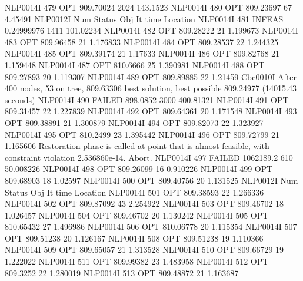 NLP0014I           479         OPT 909.70024     2024 143.1523
NLP0014I           480         OPT 809.23697       67 4.45491
NLP0012I 
              Num      Status      Obj             It       time                 Location
NLP0014I           481      INFEAS 0.24999976     1411 101.02234
NLP0014I           482         OPT 809.28222       21 1.199673
NLP0014I           483         OPT 809.96458       21 1.176833
NLP0014I           484         OPT 809.28537       22 1.244325
NLP0014I           485         OPT 809.39174       21 1.17633
NLP0014I           486         OPT 809.82768       21 1.159448
NLP0014I           487         OPT 810.6666       25 1.390981
NLP0014I           488         OPT 809.27893       20 1.119307
NLP0014I           489         OPT 809.89885       22 1.21459
Cbc0010I After 400 nodes, 53 on tree, 809.63306 best solution, best possible 809.24977 (14015.43 seconds)
NLP0014I           490      FAILED 898.0852     3000 400.81321
NLP0014I           491         OPT 809.31457       22 1.227839
NLP0014I           492         OPT 809.64361       20 1.171548
NLP0014I           493         OPT 809.38891       21 1.300879
NLP0014I           494         OPT 809.82073       22 1.323927
NLP0014I           495         OPT 810.2499       23 1.395442
NLP0014I           496         OPT 809.72799       21 1.165606
Restoration phase is called at point that is almost feasible,
  with constraint violation 2.536860e-14. Abort.
NLP0014I           497      FAILED 1062189.2      610 50.008226
NLP0014I           498         OPT 809.26099       16 0.910226
NLP0014I           499         OPT 809.68903       18 1.02597
NLP0014I           500         OPT 809.40756       20 1.131525
NLP0012I 
              Num      Status      Obj             It       time                 Location
NLP0014I           501         OPT 809.38593       22 1.266336
NLP0014I           502         OPT 809.87092       43 2.254922
NLP0014I           503         OPT 809.46702       18 1.026457
NLP0014I           504         OPT 809.46702       20 1.130242
NLP0014I           505         OPT 810.65432       27 1.496986
NLP0014I           506         OPT 810.06778       20 1.115354
NLP0014I           507         OPT 809.51238       20 1.126167
NLP0014I           508         OPT 809.51238       19 1.110366
NLP0014I           509         OPT 809.65057       21 1.313528
NLP0014I           510         OPT 809.66729       19 1.222022
NLP0014I           511         OPT 809.99382       23 1.483958
NLP0014I           512         OPT 809.3252       22 1.280019
NLP0014I           513         OPT 809.48872       21 1.163687
